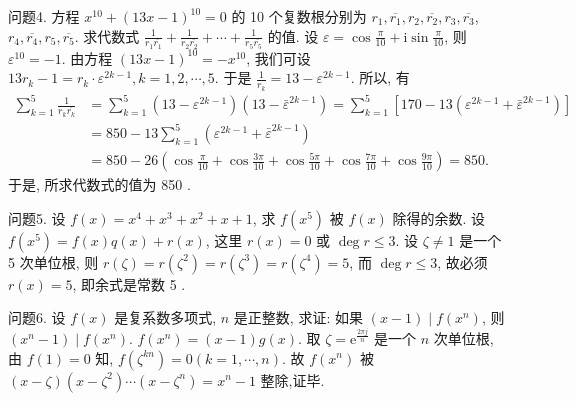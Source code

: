 问题4. 方程 $x^{10}+(13 x-1)^{10}=0$ 的 10 个复数根分别为 $r_1, \overline{r_1}, r_2, \overline{r_2}, r_3, \overline{r_3}$, $r_4, \overline{r_4}, r_5, \overline{r_5}$. 求代数式 $\frac{1}{r_1 \overline{r_1}}+\frac{1}{r_2 \overline{r_2}}+\cdots+\frac{1}{r_5 \overline{r_5}}$ 的值.
设 $\varepsilon=\cos \frac{\pi}{10}+\mathrm{i} \sin \frac{\pi}{10}$, 则 $\varepsilon^{10}=-1$.
由方程 $(13 x-1)^{10}=-x^{10}$, 我们可设 $13 r_k-1=r_k \cdot \varepsilon^{2 k-1}, k=1,2, \cdots, 5$. 于是 $\frac{1}{r_k}=13-\varepsilon^{2 k-1}$. 所以, 有
$$
\begin{aligned}
\sum_{k=1}^5 \frac{1}{r_k \overline{r_k}} & =\sum_{k=1}^5\left(13-\varepsilon^{2 k-1}\right)\left(13-\bar{\varepsilon}^{2 k-1}\right)=\sum_{k=1}^5\left[170-13\left(\varepsilon^{2 k-1}+\bar{\varepsilon}^{2 k-1}\right)\right] \\
& =850-13 \sum_{k=1}^5\left(\varepsilon^{2 k-1}+\bar{\varepsilon}^{2 k-1}\right) \\
& =850-26\left(\cos \frac{\pi}{10}+\cos \frac{3 \pi}{10}+\cos \frac{5 \pi}{10}+\cos \frac{7 \pi}{10}+\cos \frac{9 \pi}{10}\right)=850 .
\end{aligned}
$$
于是, 所求代数式的值为 850 .



问题5. 设 $f(x)=x^4+x^3+x^2+x+1$, 求 $f\left(x^5\right)$ 被 $f(x)$ 除得的余数.
设 $f\left(x^5\right)=f(x) q(x)+r(x)$, 这里 $r(x)=0$ 或 $\operatorname{deg} r \leqslant 3$.
设 $\zeta \neq 1$ 是一个 5 次单位根, 则 $r(\zeta)=r\left(\zeta^2\right)=r\left(\zeta^3\right)=r\left(\zeta^4\right)=5$, 而 $\operatorname{deg} r \leqslant 3$, 故必须 $r(x)=5$, 即余式是常数 5 .



问题6. 设 $f(x)$ 是复系数多项式, $n$ 是正整数, 求证: 如果 $(x-1) \mid f\left(x^n\right)$, 则 $\left(x^n-1\right) \mid f\left(x^n\right)$.
$f\left(x^n\right)=(x-1) g(x)$.
取 $\zeta=\mathrm{e}^{\frac{2 \pi j}{n}}$ 是一个 $n$ 次单位根, 由 $f(1)=0$ 知, $f\left(\zeta^{k n}\right)=0(k=1, \cdots, n)$.
故 $f\left(x^n\right)$ 被 $(x-\zeta)\left(x-\zeta^2\right) \cdots\left(x-\zeta^n\right)=x^n-1$ 整除,证毕.



